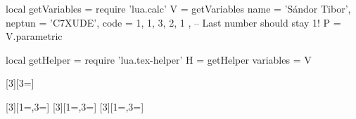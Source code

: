 \usepackage{luacode}

\begin{luacode}
  local getVariables = require 'lua.calc'
  V = getVariables {
      name = 'Sándor Tibor',
      neptun = 'C7XUDE',
      code = { 1, 1, 3, 2, 1 }, -- Last number should stay 1!
    }
  P = V.parametric

  local getHelper = require 'lua.tex-helper'
  H = getHelper {
      variables = V
    }
\end{luacode}

\usepackage{xargs}
\newcommand{\lv}[1]{\directlua{H.printVar [[#1]]}}
\newcommand{\lvec}[2]{\directlua{H.printVec { name="#1", index=#2 }}}
[3][3=]{}
\newcommand{\dv}[1]{\directlua{H.printDirect(#1)}}

[3][1=,3=]{}
[3][1=,3=]{}
[3][1=,3=]{}
\newcommand{\E}[1]{\directlua{H.printParam("E", #1)}}
\newcommand{\I}[1]{\directlua{H.printParam("I", #1)}}
